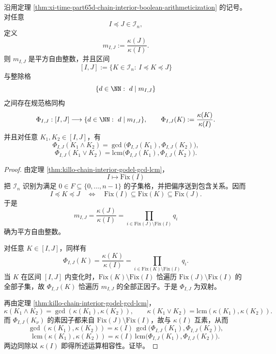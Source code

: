 \begin{theorem}[链内算子区间与平方自由整除区间的精确算术同构]\label{thm:xi-time-part65d-chain-interior-interval-squarefree-divisor-isomorphism}
沿用定理 \ref{thm:xi-time-part65d-chain-interior-boolean-arithmeticization} 的记号。对任意
\[
I\preceq J\in \mathcal I_n,
\]
定义
\[
m_{I,J}:=\frac{\kappa(J)}{\kappa(I)}.
\]
则 \(m_{I,J}\) 是平方自由整数，并且区间
\[
[I,J]:=\{K\in \mathcal I_n:\ I\preceq K\preceq J\}
\]
与整除格
\[
\{d\in\NN:\ d\mid m_{I,J}\}
\]
之间存在规范格同构
\[
\Phi_{I,J}:[I,J]\longrightarrow \{d\in\NN:\ d\mid m_{I,J}\},
\qquad
\Phi_{I,J}(K):=\frac{\kappa(K)}{\kappa(I)}.
\]
并且对任意 \(K_1,K_2\in [I,J]\)，有
\[
\Phi_{I,J}(K_1\wedge K_2)
=
\gcd\!\bigl(\Phi_{I,J}(K_1),\Phi_{I,J}(K_2)\bigr),
\]
\[
\Phi_{I,J}(K_1\vee K_2)
=
\mathrm{lcm}\!\bigl(\Phi_{I,J}(K_1),\Phi_{I,J}(K_2)\bigr).
\]
\end{theorem}
\begin{proof}
由定理 \ref{thm:killo-chain-interior-godel-gcd-lcm}，
\[
I\longmapsto \mathrm{Fix}(I)
\]
把 \(\mathcal I_n\) 识别为满足 \(0\in F\subseteq\{0,\dots,n-1\}\) 的子集格，并把偏序送到包含关系。因而
\[
I\preceq K\preceq J
\quad\Longleftrightarrow\quad
\mathrm{Fix}(I)\subseteq \mathrm{Fix}(K)\subseteq \mathrm{Fix}(J).
\]
于是
\[
m_{I,J}
=
\frac{\kappa(J)}{\kappa(I)}
=
\prod_{i\in \mathrm{Fix}(J)\setminus \mathrm{Fix}(I)}q_i
\]
确为平方自由整数。

对任意 \(K\in[I,J]\)，同样有
\[
\Phi_{I,J}(K)
=
\frac{\kappa(K)}{\kappa(I)}
=
\prod_{i\in \mathrm{Fix}(K)\setminus \mathrm{Fix}(I)}q_i.
\]
当 \(K\) 在区间 \([I,J]\) 内变化时，\(\mathrm{Fix}(K)\setminus \mathrm{Fix}(I)\) 恰遍历
\(\mathrm{Fix}(J)\setminus \mathrm{Fix}(I)\) 的全部子集，故 \(\Phi_{I,J}(K)\) 恰遍历 \(m_{I,J}\) 的全部正因子。于是 \(\Phi_{I,J}\) 为双射。

再由定理 \ref{thm:killo-chain-interior-godel-gcd-lcm}，
\[
\kappa(K_1\wedge K_2)=\gcd(\kappa(K_1),\kappa(K_2)),
\qquad
\kappa(K_1\vee K_2)=\mathrm{lcm}(\kappa(K_1),\kappa(K_2)).
\]
而 \(\Phi_{I,J}(K_\nu)\) 的素因子都来自 \(\mathrm{Fix}(J)\setminus \mathrm{Fix}(I)\)，故与 \(\kappa(I)\) 互素，从而
\[
\gcd(\kappa(K_1),\kappa(K_2))
=
\kappa(I)\,
\gcd\!\bigl(\Phi_{I,J}(K_1),\Phi_{I,J}(K_2)\bigr),
\]
\[
\mathrm{lcm}(\kappa(K_1),\kappa(K_2))
=
\kappa(I)\,
\mathrm{lcm}\!\bigl(\Phi_{I,J}(K_1),\Phi_{I,J}(K_2)\bigr).
\]
两边同除以 \(\kappa(I)\) 即得所述运算相容性。证毕。
\end{proof}

